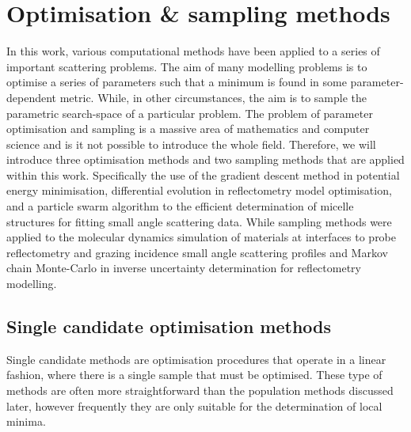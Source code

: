 \section{Optimisation \& sampling methods}
\label{sec:optimisation}
In this work, various computational methods have been applied to a series of important scattering problems.
The aim of many modelling problems is to optimise a series of parameters such that a minimum is found in some parameter-dependent metric.
While, in other circumstances, the aim is to sample the parametric search-space of a particular problem.
The problem of parameter optimisation and sampling is a massive area of mathematics and computer science and is it not possible to introduce the whole field.
Therefore, we will introduce three optimisation methods and two sampling methods that are applied within this work.
Specifically the use of the gradient descent method in potential energy minimisation, differential evolution in reflectometry model optimisation, and a particle swarm algorithm to the efficient determination of micelle structures for fitting small angle scattering data.
While sampling methods were applied to the molecular dynamics simulation of materials at interfaces to probe reflectometry and grazing incidence small angle scattering profiles and Markov chain Monte-Carlo in inverse uncertainty determination for reflectometry modelling.

\subsection{Single candidate optimisation methods}
\label{sec:singlecan}
Single candidate methods are optimisation procedures that operate in a linear fashion, where there is a single sample that must be optimised.
These type of methods are often more straightforward than the population methods discussed later, however frequently they are only suitable for the determination of local minima.

